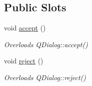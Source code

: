 \subsection*{Public Slots}
\begin{DoxyCompactItemize}
\item 
void \hyperlink{classmdt_sql_dialog_old_a8fb8b8a8cd090c10c8c7d7f718de6198}{accept} ()
\begin{DoxyCompactList}\small\item\em Overloads Q\-Dialog\-::accept() \end{DoxyCompactList}\item 
void \hyperlink{classmdt_sql_dialog_old_adb9be20150730eca0a1e14df3ba9f05a}{reject} ()
\begin{DoxyCompactList}\small\item\em Overloads Q\-Dialog\-::reject() \end{DoxyCompactList}\end{DoxyCompactItemize}
